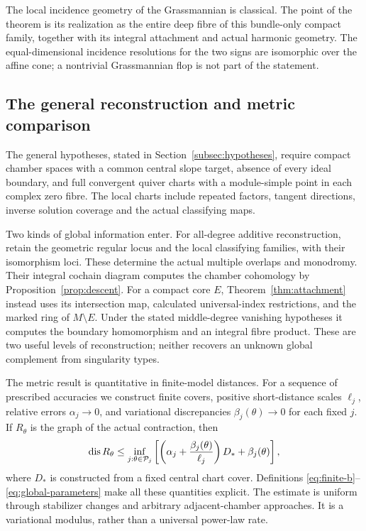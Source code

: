 The local incidence geometry of the Grassmannian is classical.
The point of the theorem is its realization as the entire deep
fibre of this bundle-only compact family, together with its
integral attachment and actual harmonic geometry.
The equal-dimensional incidence resolutions for the two signs
are isomorphic over the affine cone; a nontrivial
Grassmannian flop is not part of the statement.

\subsection{The general reconstruction and metric comparison}
The general hypotheses, stated in
Section~\ref{subsec:hypotheses}, require compact chamber
spaces with a common central slope target, absence of every
ideal boundary, and full convergent quiver charts with a
module-simple point in each complex zero fibre.
The local charts include repeated factors, tangent directions,
inverse solution coverage and the actual classifying maps.

Two kinds of global information enter. For all-degree additive
reconstruction, retain the geometric regular locus and the
local classifying families, with their isomorphism loci.
These determine the actual multiple overlaps and monodromy.
Their integral cochain diagram computes the chamber cohomology
by Proposition~\ref{prop:descent}.
For a compact core \(E\), Theorem~\ref{thm:attachment}
instead uses its intersection map, calculated universal-index
restrictions, and the marked ring of \(M\setminus E\).
Under the stated middle-degree vanishing hypotheses it computes
the boundary homomorphism and an integral fibre product.
These are two useful levels of reconstruction; neither
recovers an unknown global complement from singularity types.

The metric result is quantitative in finite-model distances.
For a sequence of prescribed accuracies we construct finite
covers, positive short-distance scales \(\ell_j\), relative
errors \(\alpha_j\to0\), and variational discrepancies
\(\beta_j(\theta)\to0\) for each fixed \(j\).
If \(R_\theta\) is the graph of the actual contraction, then
\[
 \operatorname{dis} R_\theta\le
 \inf_{j:\theta\in\mathcal P_j}
 \left[\left(\alpha_j+\frac{\beta_j(\theta)}{\ell_j}\right)D_*
                +\beta_j(\theta)\right],
\]
where \(D_*\) is constructed from a fixed central chart cover.
Definitions \eqref{eq:finite-b}--\eqref{eq:global-parameters}
make all these quantities explicit.
The estimate is uniform through stabilizer changes and
arbitrary adjacent-chamber approaches. It is a variational
modulus, rather than a universal power-law rate.

